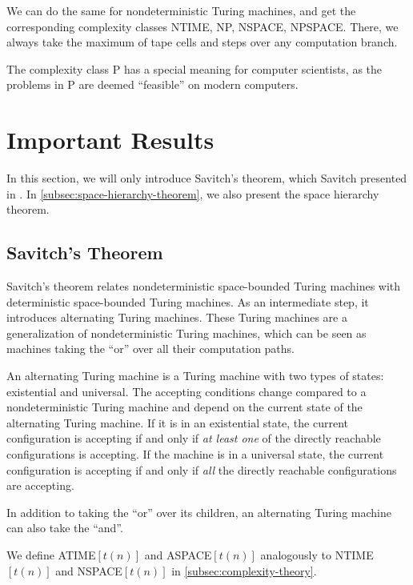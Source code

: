 We can do the same for nondeterministic Turing machines, and get the corresponding complexity classes NTIME, NP, NSPACE, NPSPACE\@.
There, we always take the maximum of tape cells and steps over any computation branch.

The complexity class P has a special meaning for computer scientists, as the problems in P are deemed ``feasible'' on modern computers.


\section{Important Results}\label{sec:important-results}

In this section, we will only introduce Savitch's theorem, which Savitch presented in \cite{Savitch1970}.
In \cref{subsec:space-hierarchy-theorem}, we also present the space hierarchy theorem.

\subsection{Savitch's Theorem}\label{subsec:nspacesubsetdspacesquared}

Savitch's theorem relates nondeterministic space-bounded Turing machines with deterministic space-bounded Turing machines.
As an intermediate step, it introduces alternating Turing machines.
These Turing machines are a generalization of nondeterministic Turing machines, which can be seen as machines taking the ``or'' over all their computation paths.

\begin{define}
    An alternating Turing machine is a Turing machine with two types of states: existential and universal.
    The accepting conditions change compared to a nondeterministic Turing machine and depend on the current state of the alternating Turing machine.
    If it is in an existential state, the current configuration is accepting if and only if \emph{at least one} of the directly reachable configurations is accepting.
    If the machine is in a universal state, the current configuration is accepting if and only if \emph{all} the directly reachable configurations are accepting.
\end{define}

In addition to taking the ``or'' over its children, an alternating Turing machine can also take the ``and''.

\sloppy We define ATIME$[t(n)]$ and ASPACE$[t(n)]$ analogously to NTIME$[t(n)]$ and NSPACE$[t(n)]$ in \cref{subsec:complexity-theory}.

